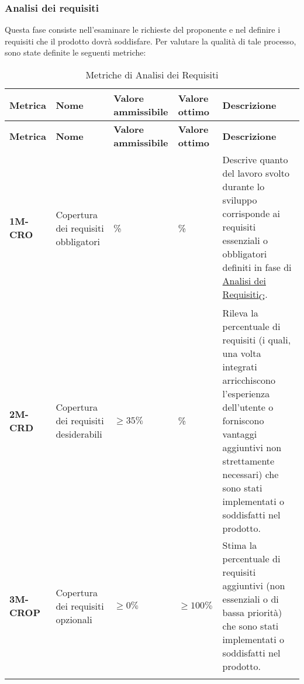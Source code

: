 \subsubsection{Analisi dei requisiti}
Questa fase consiste nell'esaminare le richieste del proponente e nel definire i requisiti che il prodotto dovrà soddisfare. Per valutare la qualità di tale processo, sono state definite le seguenti metriche:
\begin{longtable}{|>{\raggedright\arraybackslash}m{}|>{\raggedright\arraybackslash}m{}|>{\raggedright\arraybackslash}m{}|>{\raggedright\arraybackslash}m{}|>{\raggedright\arraybackslash}m{}|}
	\hline
	\textbf{Metrica} & \textbf{Nome} & \textbf{Valore ammissibile} & \textbf{Valore ottimo} & \textbf{Descrizione}\\
	\hline
	\endfirsthead
	\hline
	\textbf{Metrica} & \textbf{Nome} & \textbf{Valore ammissibile} & \textbf{Valore ottimo} & \textbf{Descrizione}\\
	\endhead
	\textbf{1M-CRO}  & Copertura dei requisiti obbligatori  & 100\% & 100\% & Descrive quanto del lavoro svolto durante lo sviluppo corrisponde ai requisiti essenziali o obbligatori definiti in fase di \href{https://7last.github.io/docs/rtb/documentazione-interna/glossario\#analisi-dei-requisiti}{Analisi dei Requisiti\textsubscript{G}}.\\
	\hline
	\textbf{2M-CRD}  & Copertura dei requisiti desiderabili & $\geq 35\% $ & 100\% & Rileva la percentuale di requisiti (i quali, una volta integrati arricchiscono l'esperienza dell'utente o forniscono vantaggi aggiuntivi non strettamente necessari) che sono stati implementati o soddisfatti nel prodotto. \\
	\hline
	\textbf{3M-CROP} & Copertura dei requisiti opzionali & $\geq 0\% $ & $\geq 100\% $ & Stima la percentuale di requisiti aggiuntivi (non essenziali o di bassa priorità) che sono stati implementati o soddisfatti nel prodotto.\\
	\hline
	\caption{Metriche di Analisi dei Requisiti}
	\label{table:1}
\end{longtable}

